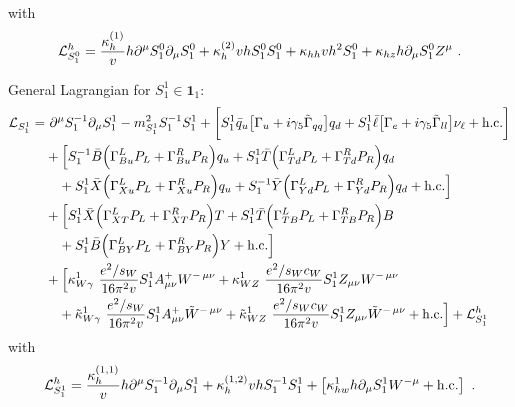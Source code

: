 \documentclass[preprintnumbers,nofootinbib,showpacs,eqsecnum,pre,12pt]{revtex4-1}
\begin{document}
with
\begin{align}
{\cal L}_{S_1^0}^h = 
\frac{\kappa^{(1)}_h}{v} h \partial^\mu S_1^0 \partial_\mu S_1^0
+ \kappa^{(2)}_h  v h S_1^0 S_1^0
+ \kappa_{hh} v h^2 S_1^0
+ \kappa_{hz} h \partial_\mu S_1^0 Z^\mu \ .
\end{align}

\noindent
General Lagrangian for $S_1^1\in \mathbf 1_1$:
\begin{align}
    {\cal L}_{S_1^1} = &\
      \partial^\mu S_1^{-1} \partial_\mu S_1^1
    -  m^2_{S_1^1} S_1^{-1} S_1^1  + \bigg[
      S_1^1 \bar q_u      \big[ \Gamma_{u} + i\gamma_5\tilde\Gamma_{qq}
         \big] q_d
    + S_1^1 \bar \ell     \big[ \Gamma_{e} + i\gamma_5\tilde\Gamma_{ll}
         \big] \nu_\ell 
     + {\rm h.c.} \bigg]\nonumber\\
    & +  \Big[
     S_1^{-1} \bar B\Big(\Gamma_{Bu}^{L}P_L+  \Gamma_{Bu}^{R}P_R\Big)q_u  + S_1^{1}\bar T\Big(\Gamma_{Td}^{L}P_L+\Gamma_{Td}^{R}P_R\Big)q_d \Big.\nonumber\\
     &\quad \Big.
   + S_1^{1}\bar X\Big(\Gamma_{Xu}^{L}P_L+\Gamma_{Xu}^{R}P_R\Big)q_u 
   + S_1^{-1}\bar Y\Big(\Gamma_{Yd}^{L}P_L+\Gamma_{Yd}^{R}P_R\Big)q_d 
   + {\rm h.c.} \Big]\nonumber\\
   & +  \Big[
      S_1^{1}\bar X\Big(\Gamma_{XT}^{L}P_L+\Gamma_{XT}^{R}P_R\Big)T 
   + S_1^{1}\bar T\Big(\Gamma_{TB}^{L}P_L+\Gamma_{TB}^{R}P_R\Big)B\Big.\nonumber\\
     &\quad \Big.
   + S_1^{1}\bar B\Big(\Gamma_{BY}^{L}P_L+\Gamma_{BY}^{R}P_R\Big)Y 
   + {\rm h.c.} \Big]\nonumber\\
   &
      + \Big[ \kappa_{W\gamma}^1\ \frac{e^2/ s_W }{16\pi^2 v} S_1^1 A^+_{\mu\nu} W^{-\,\mu\nu}
      + \kappa_{WZ}^1\ \frac{e^2/ s_W c_W  }{16\pi^2 v} S_1^1 Z_{\mu\nu} W^{-\,\mu\nu} \Big.\nonumber\\
      &\quad \Big.
      + \tilde\kappa_{W\gamma}^1\ \frac{e^2/ s_W  }{16\pi^2 v} S_1^1 A^+_{\mu\nu} \tilde W^{-\,\mu\nu}
      + \tilde\kappa_{WZ}^1\ \frac{e^2/ s_W c_W }{16\pi^2 v} S_1^1 Z_{\mu\nu} \tilde W^{-\,\mu\nu} + {\rm h.c.} \Big] + {\cal L}_{S_1^1}^h  
\end{align}
with
\begin{align}
  {\cal L}_{S_1^1}^h = 
     \frac{\kappa^{(1,1)}_h}{v} h \partial^\mu S_1^{-1} \partial_\mu S_1^1
   + \kappa^{(1,2)}_h  v h S_1^{-1} S_1^1
   + \left[ \kappa^1_{hw} h \partial_\mu S_1^1 W^{-\mu} + {\rm h.c.} \right]\ .
\end{align}
\end{document}
